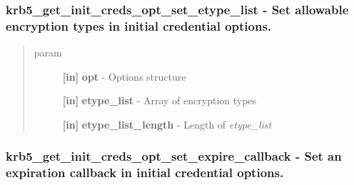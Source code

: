 \documentclass[letterpaper,10pt,english]{sphinxmanual}
\begin{document}
\subsubsection{krb5\_get\_init\_creds\_opt\_set\_etype\_list -  Set allowable encryption types in initial credential options.}
\label{appdev/refs/api/krb5_get_init_creds_opt_set_etype_list:krb5-get-init-creds-opt-set-etype-list-set-allowable-encryption-types-in-initial-credential-options}\label{appdev/refs/api/krb5_get_init_creds_opt_set_etype_list::doc}

\begin{fulllineitems}
\label{appdev/refs/api/krb5_get_init_creds_opt_set_etype_list:c.krb5_get_init_creds_opt_set_etype_list}
\end{fulllineitems}

\begin{quote}\begin{description}
\item[{param}] \leavevmode
\textbf{{[}in{]}} \textbf{opt} - Options structure

\textbf{{[}in{]}} \textbf{etype\_list} - Array of encryption types

\textbf{{[}in{]}} \textbf{etype\_list\_length} - Length of \emph{etype\_list}

\end{description}\end{quote}


\subsubsection{krb5\_get\_init\_creds\_opt\_set\_expire\_callback -  Set an expiration callback in initial credential options.}
\label{appdev/refs/api/krb5_get_init_creds_opt_set_expire_callback::doc}\label{appdev/refs/api/krb5_get_init_creds_opt_set_expire_callback:krb5-get-init-creds-opt-set-expire-callback-set-an-expiration-callback-in-initial-credential-options}

\begin{fulllineitems}
\label{appdev/refs/api/krb5_get_init_creds_opt_set_expire_callback:c.krb5_get_init_creds_opt_set_expire_callback}
\end{fulllineitems}
\end{document}

